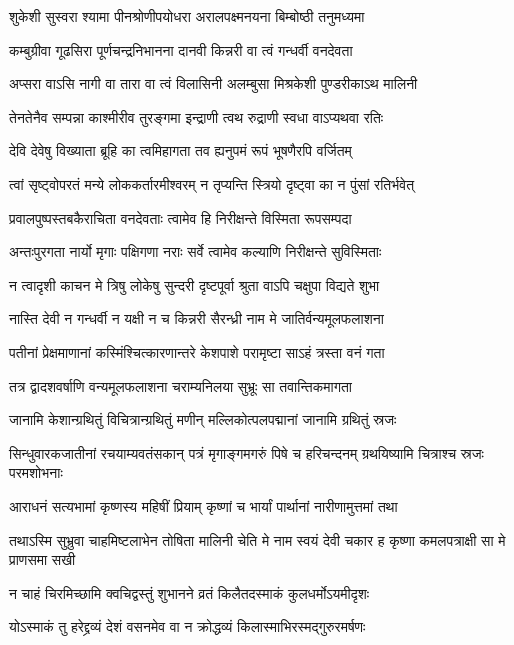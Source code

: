 \twolineshloka
{शुकेशी सुस्वरा श्यामा पीनश्रोणीपयोधरा}
{अरालपक्ष्मनयना बिम्बोष्ठी तनुमध्यमा}


\twolineshloka
{कम्बुग्रीवा गूढसिरा पूर्णचन्द्रनिभानना}
{दानवी किन्नरी वा त्वं गन्धर्वी वनदेवता}


\twolineshloka
{अप्सरा वाऽसि नागी वा तारा वा त्वं विलासिनी}
{अलम्बुसा मिश्रकेशी पुण्डरीकाऽथ मालिनी}


\twolineshloka
{तेनतेनैव सम्पन्ना काश्मीरीव तुरङ्गमा}
{इन्द्राणी त्वथ रुद्राणी स्वधा वाऽप्यथवा रतिः}


\twolineshloka
{देवि देवेषु विख्याता ब्रूहि का त्वमिहागता}
{तव ह्यनुपमं रूपं भूषणैरपि वर्जितम्}


\twolineshloka
{त्वां सृष्ट्वोपरतं मन्ये लोककर्तारमीश्वरम्}
{न तृप्यन्ति स्त्रियो दृष्ट्वा का न पुंसां रतिर्भवेत्}


\twolineshloka
{प्रवालपुष्पस्तबकैराचिता वनदेवताः}
{त्वामेव हि निरीक्षन्ते विस्मिता रूपसम्पदा}


\twolineshloka
{अन्तःपुरगता नार्यो मृगाः पक्षिगणा नराः}
{सर्वे त्वामेव कल्याणि निरीक्षन्ते सुविस्मिताः}


\twolineshloka
{न त्वादृशी काचन मे त्रिषु लोकेषु सुन्दरी}
{दृष्टपूर्वा श्रुता वाऽपि चक्षुपा विद्यते शुभा}




\twolineshloka
{नास्ति देवी न गन्धर्वी न यक्षी न च किन्नरी}
{सैरन्ध्री नाम मे जातिर्वन्यमूलफलाशना}


\twolineshloka
{पतीनां प्रेक्षमाणानां कस्मिंश्चित्कारणान्तरे}
{केशपाशे परामृष्टा साऽहं त्रस्ता वनं गता}


\twolineshloka
{तत्र द्वादशवर्षाणि वन्यमूलफलाशना}
{चराम्यनिलया सुभ्रूः सा तवान्तिकमागता}


\twolineshloka
{जानामि केशान्ग्रथितुं विचित्रान्ग्रथितुं मणीन्}
{मल्लिकोत्पलपद्मानां जानामि ग्रथितुं स्रजः}


\threelineshloka
{सिन्धुवारकजातीनां रचयाम्यवतंसकान्}
{पत्रं मृगाङ्गमगरुं पिषे च हरिचन्दनम्}
{ग्रथयिष्यामि चित्राश्च स्रजः परमशोभनाः}


\twolineshloka
{आराधनं सत्यभामां कृष्णस्य महिषीं प्रियाम्}
{कृष्णां च भार्यां पार्थानां नारीणामुत्तमां तथा}


\threelineshloka
{तथाऽस्मि सुभ्रुवा चाहमिष्टलाभेन तोषिता}
{मालिनी चेति मे नाम स्वयं देवी चकार ह}
{कृष्णा कमलपत्राक्षी सा मे प्राणसमा सखी}


\twolineshloka
{न चाहं चिरमिच्छामि क्वचिद्वस्तुं शुभानने}
{व्रतं किलैतदस्माकं कुलधर्मोऽयमीदृशः}


\twolineshloka
{योऽस्माकं तु हरेद्द्रव्यं देशं वसनमेव वा}
{न क्रोद्धव्यं किलास्माभिरस्मद्गुरुरमर्षणः}


